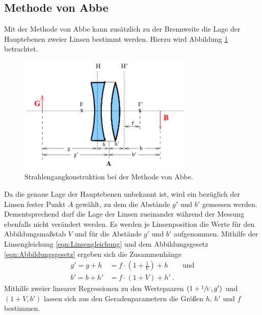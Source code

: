 \subsection{Methode von Abbe}

Mit der Methode von Abbe kann zusätzlich zu der Brennweite die Lage der Hauptebenen zweier Linsen bestimmt werden. 
Hierzu wird Abbildung \ref{fig:Abbe} betrachtet. 
\begin{figure}
    \centering
    \includegraphics[width=0.75\textwidth]{plots/2LinsenTeil2.png}
    \caption{Strahlengangkonstruktion bei der Methode von Abbe\cite{Versuchsanleitung}.}
    \label{fig:Abbe}
\end{figure}
Da die genaue Lage der Hauptebenen unbekannt ist, wird ein bezüglich der Linsen fester Punkt $A$ gewählt, zu dem die Abstände $g'$ und $b'$ gemessen werden. 
Dementsprechend darf die Lage der Linsen zueinander während der Messung ebenfalls nicht verändert werden.
Es werden je Linsenposition die Werte für den Abbildungsmaßstab $V$ und für die Abstände $g'$ und $b'$ aufgenommen. 
Mithilfe der Linsengleichung \eqref{eqn:Linsengleichung} und dem Abbildungsgesetz \eqref{eqn:Abbildungsgesetz} ergeben sich die Zusammenhänge 
\begin{align}
    g'=g+h &=f\cdot (1+\frac{1}{V})+h \qquad \text{und}\\
    b'=b+h'&=f\cdot (1+V)+h'\:.
    \label{eqn:linear}
\end{align}
Mithilfe zweier linearer Regressionen zu den Wertepaaren $(1+\sfrac{1}{V},g')$ und $(1+V,b')$ lassen sich aus den Geradenparametern 
die Größen $h$, $h'$ und $f$ bestimmen\cite{Versuchsanleitung}. 

